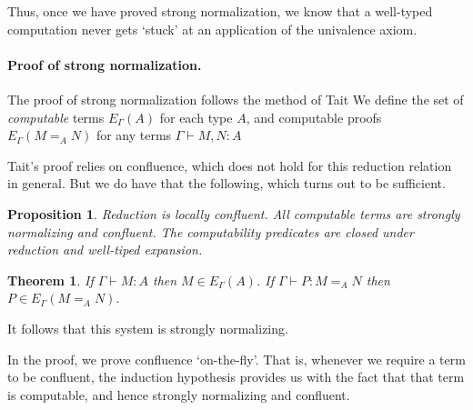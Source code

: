 \documentclass{easychair}
\newtheorem{theorem}[lemma]{Theorem}
\newtheorem{proposition}[lemma]{Proposition}
\begin{document}
Thus, once we have proved strong normalization, we know that a well-typed computation never gets `stuck' at an application of the univalence axiom.

\paragraph{Proof of strong normalization.}

The proof of strong normalization follows the method of Tait \cite{Tait1967}
We define the set of \emph{computable} terms $E_\Gamma(A)$ for each type $A$,
and computable proofs $E_\Gamma(M =_A N)$ for any terms $\Gamma \vdash M,N : A$

Tait's proof relies on confluence, which does not hold for this reduction relation in general.  But we do have that the following, which turns out to be sufficient.

\begin{proposition}
Reduction is locally confluent.  All computable terms are strongly normalizing and confluent.  The computability predicates are closed under reduction and well-tiped expansion.
\end{proposition}

\begin{theorem}
If $\Gamma \vdash M : A$ then $M \in E_\Gamma(A)$.  If $\Gamma \vdash P : M =_A N$ then $P \in E_\Gamma(M =_A N)$.
\end{theorem}
It follows that this system is strongly normalizing.

In the proof, we prove confluence `on-the-fly'.  That is, whenever we require a term to be confluent, the induction hypothesis provides us with the fact that that term is computable, and hence strongly normalizing and confluent.



\end{document}
